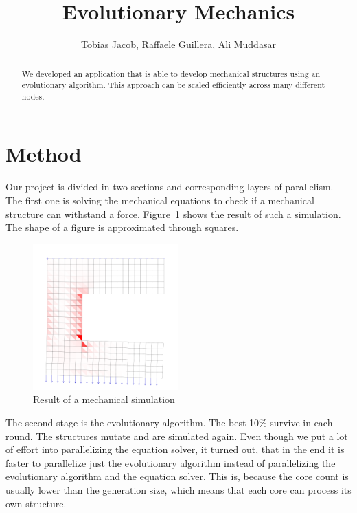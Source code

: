 \documentclass[12pt]{article}
\title{Evolutionary Mechanics}
\author{Tobias Jacob, Raffaele Guillera, Ali Muddasar}
\begin{document}
\maketitle

\begin{abstract}
    We developed an application that is able to develop mechanical structures using an evolutionary algorithm. This approach can be scaled efficiently across many different nodes.
\end{abstract}

\section{Method}

Our project is divided in two sections and corresponding layers of parallelism. The first one is solving the mechanical equations to check if a mechanical structure can withstand a force. Figure~\ref{fig:Mechanical_Simulation} shows the result of such a simulation. The shape of a figure is approximated through squares.

\begin{figure}[t]
    \centering
    \includegraphics[width=0.5\textwidth]{images/MechaincalStructure.png}
    \caption{Result of a mechanical simulation}
    \label{fig:Mechanical_Simulation}
\end{figure}


The second stage is the evolutionary algorithm. The best 10\% survive in each round. The structures mutate and are simulated again. Even though we put a lot of effort into parallelizing the equation solver, it turned out, that in the end it is faster to parallelize just the evolutionary algorithm instead of parallelizing the evolutionary algorithm and the equation solver. This is, because the core count is usually lower than the generation size, which means that each core can process its own structure. 
\end{document}
